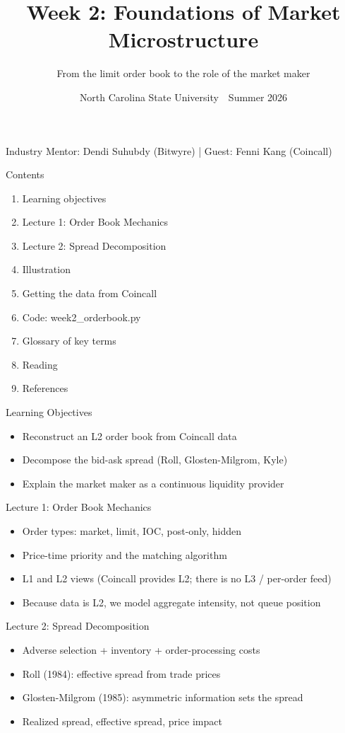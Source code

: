 \documentclass[aspectratio=169,10pt]{beamer}
\title{Week 2: Foundations of Market Microstructure}
\subtitle{From the limit order book to the role of the market maker}
\date{North Carolina State University \,\textbar\, Summer 2026}
\begin{document}
\begin{frame}[plain]\titlepage\begin{center}\tiny Industry Mentor: Dendi Suhubdy (Bitwyre)  |  Guest: Fenni Kang (Coincall)\end{center}\end{frame}
\begin{frame}{Contents}
\small\begin{enumerate}\setlength{\itemsep}{3pt}
  \item Learning objectives
  \item Lecture 1: Order Book Mechanics
  \item Lecture 2: Spread Decomposition
  \item Illustration
  \item Getting the data from Coincall
  \item Code: week2\_orderbook.py
  \item Glossary of key terms
  \item Reading
  \item References
\end{enumerate}
\end{frame}

\begin{frame}{Learning Objectives}
\begin{itemize}
  \item Reconstruct an L2 order book from Coincall data
  \item Decompose the bid-ask spread (Roll, Glosten-Milgrom, Kyle)
  \item Explain the market maker as a continuous liquidity provider
\end{itemize}
\end{frame}

\begin{frame}{Lecture 1: Order Book Mechanics}
\begin{itemize}
  \item Order types: market, limit, IOC, post-only, hidden
  \item Price-time priority and the matching algorithm
  \item L1 and L2 views (Coincall provides L2; there is no L3 / per-order feed)
  \item Because data is L2, we model aggregate intensity, not queue position
\end{itemize}
\end{frame}

\begin{frame}{Lecture 2: Spread Decomposition}
\begin{itemize}
  \item Adverse selection + inventory + order-processing costs
  \item Roll (1984): effective spread from trade prices
  \item Glosten-Milgrom (1985): asymmetric information sets the spread
  \item Realized spread, effective spread, price impact
\end{itemize}
\end{frame}
\end{document}
